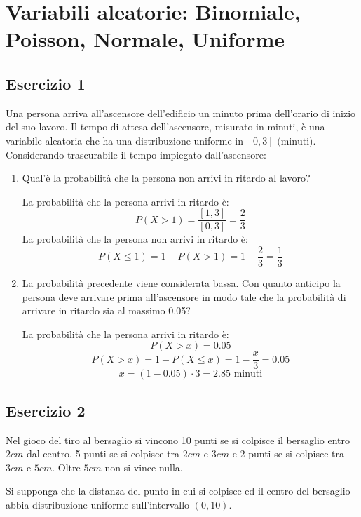 \documentclass[a4paper]{article}
\theoremstyle{break}
\theoremstyle{break}
\theoremstyle{break}
\theoremstyle{break}
\begin{document}
\section{Variabili aleatorie: Binomiale, Poisson, Normale, Uniforme}
\subsection{Esercizio 1}
Una persona arriva all'ascensore dell'edificio un minuto prima dell'orario di inizio del
suo lavoro. Il tempo di attesa dell'ascensore, misurato in minuti, è una variabile
aleatoria che ha una distribuzione uniforme in \( [0,3] \text{ (minuti)} \). Considerando
trascurabile il tempo impiegato dall'ascensore:
\begin{enumerate}
	\item Qual'è la probabilità che la persona non arrivi in ritardo al lavoro?

	      \vspace{1em}
	      La probabilità che la persona arrivi in ritardo è:
	      \[
		      P(X > 1) = \frac{[1,3]}{[0,3]} = \frac{2}{3}
	      \]
	      La probabilità che la persona non arrivi in ritardo è:
	      \[
		      P(X \le 1) = 1 - P(X > 1) = 1 - \frac{2}{3} = \frac{1}{3}
	      \]
	\item La probabilità precedente viene considerata bassa. Con quanto anticipo la persona
	      deve arrivare prima all'ascensore in modo tale che la probabilità di arrivare in
	      ritardo sia al massimo 0.05?

	      \vspace{1em}
	      La probabilità che la persona arrivi in ritardo è:
	      \[
		      P(X > x) = 0.05
	      \]
	      \[
		      P(X > x) = 1 - P(X \le x) = 1 - \frac{x}{3} = 0.05
	      \]
	      \[
		      x = (1 - 0.05) \cdot 3 = 2.85 \text{ minuti}
	      \]
\end{enumerate}

\subsection{Esercizio 2}
Nel gioco del tiro al bersaglio si vincono 10 punti se si colpisce il bersaglio entro
\( 2cm \) dal centro, 5 punti se si colpisce tra \( 2cm \)  e \( 3cm \) e 2 punti se si
colpisce tra \( 3cm \) e \( 5cm \). Oltre \( 5cm \) non si vince nulla.

\noindent Si supponga che la distanza del punto in cui si colpisce ed il centro del
bersaglio abbia distribuzione uniforme sull'intervallo \( (0,10) \).
\end{document}
